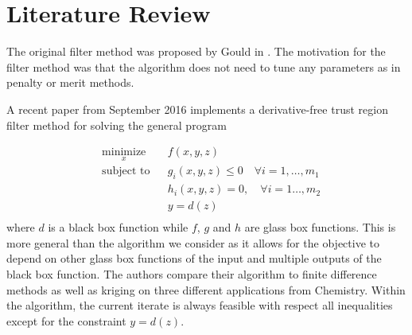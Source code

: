 \documentclass{article}
\begin{document}





\section{Literature Review}

The original filter method was proposed by Gould in \cite{DUMMY:original_filter}. The motivation for the filter method was that the algorithm does not need to tune any parameters as in penalty or merit methods.

A recent paper from September 2016 \cite{DUMMY:Biegler} implements a derivative-free trust region filter method for solving the general program

\begin{equation*}
\begin{aligned}
& \underset{x}{\text{minimize}} & & f(x, y, z) \\
& \text{subject to} & & g_i(x, y, z) \leq 0 \quad \forall i = 1, \ldots, m_1 \\
& & & h_i(x, y, z) = 0, \quad \forall i = 1 \ldots, m_2 \\
& & & y = d(z) \;  \\
\end{aligned}
\end{equation*}
where $d$ is a black box function while $f$, $g$ and $h$ are glass box functions.
This is more general than the algorithm we consider as it allows for the objective to depend on other glass box functions of the input and multiple outputs of the black box function. The authors compare their algorithm to finite difference methods as well as kriging on three different applications from Chemistry. Within the algorithm, the current iterate is always feasible with respect all inequalities except for the constraint $y=d(z)$.
\end{document}
